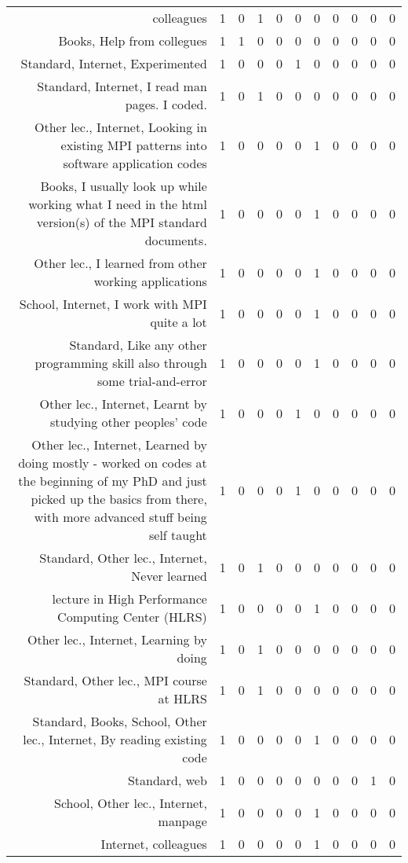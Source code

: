 {\begin{landscape}
\begin{longtable}[htb]{r|c|c|c|c|c|c|c|c|c|c}
{colleagues} & 1 & 0 & 1 & 0 & 0 & 0 & 0 & 0 & 0 & 0 \\%
{Books, Help from collegues} & 1 & 1 & 0 & 0 & 0 & 0 & 0 & 0 & 0 & 0 \\%
{Standard, Internet, Experimented} & 1 & 0 & 0 & 0 & 1 & 0 & 0 & 0 & 0 & 0 \\%
{Standard, Internet, I read man pages. I coded.} & 1 & 0 & 1 & 0 & 0 & 0 & 0 & 0 & 0 & 0 \\%
{Other lec., Internet, Looking in existing MPI patterns into software application codes} & 1 & 0 & 0 & 0 & 0 & 1 & 0 & 0 & 0 & 0 \\%
{Books, I usually look up while working what I need in the html version(s) of the MPI standard documents.} & 1 & 0 & 0 & 0 & 0 & 1 & 0 & 0 & 0 & 0 \\%
{Other lec., I learned from other working applications} & 1 & 0 & 0 & 0 & 0 & 1 & 0 & 0 & 0 & 0 \\%
{School, Internet, I work with MPI quite a lot} & 1 & 0 & 0 & 0 & 0 & 1 & 0 & 0 & 0 & 0 \\%
{Standard, Like any other programming skill also through some trial-and-error} & 1 & 0 & 0 & 0 & 0 & 1 & 0 & 0 & 0 & 0 \\%
{Other lec., Internet, Learnt by studying other peoples' code} & 1 & 0 & 0 & 0 & 1 & 0 & 0 & 0 & 0 & 0 \\%
{Other lec., Internet, Learned by doing mostly - worked on codes at the beginning of my PhD and just picked up the basics from there, with more advanced stuff being self taught} & 1 & 0 & 0 & 0 & 1 & 0 & 0 & 0 & 0 & 0 \\%
{Standard, Other lec., Internet, Never learned} & 1 & 0 & 1 & 0 & 0 & 0 & 0 & 0 & 0 & 0 \\%
{lecture in High Performance Computing Center (HLRS)} & 1 & 0 & 0 & 0 & 0 & 1 & 0 & 0 & 0 & 0 \\%
{Other lec., Internet, Learning by doing} & 1 & 0 & 1 & 0 & 0 & 0 & 0 & 0 & 0 & 0 \\%
{Standard, Other lec., MPI course at HLRS} & 1 & 0 & 1 & 0 & 0 & 0 & 0 & 0 & 0 & 0 \\%
{Standard, Books, School, Other lec., Internet, By reading existing code} & 1 & 0 & 0 & 0 & 0 & 1 & 0 & 0 & 0 & 0 \\%
{Standard, web} & 1 & 0 & 0 & 0 & 0 & 0 & 0 & 0 & 1 & 0 \\%
{School, Other lec., Internet, manpage} & 1 & 0 & 0 & 0 & 0 & 1 & 0 & 0 & 0 & 0 \\%
{Internet, colleagues} & 1 & 0 & 0 & 0 & 0 & 1 & 0 & 0 & 0 & 0 \\%

\end{longtable}
\end{landscape}}
